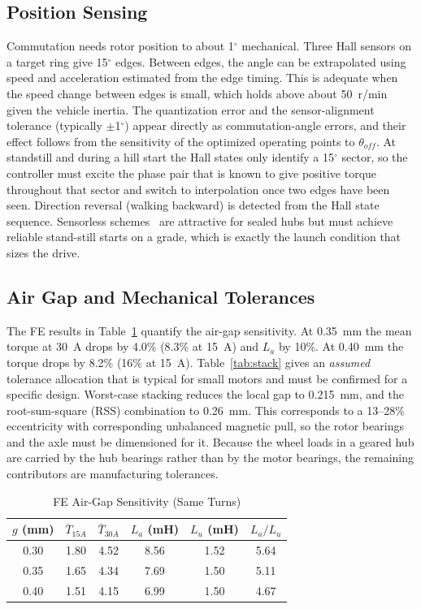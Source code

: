 \documentclass[journal]{IEEEtran}
\begin{document}
\subsection{Position Sensing}
Commutation needs rotor position to about 1$^\circ$ mechanical. Three Hall
sensors on a target ring give 15$^\circ$ edges. Between edges, the angle can be
extrapolated using speed and acceleration estimated from the edge timing. This
is adequate when the speed change between edges is small, which holds above
about 50~r/min given the vehicle inertia. The quantization error and the
sensor-alignment tolerance (typically $\pm$1$^\circ$) appear directly as
commutation-angle errors, and their effect follows from the sensitivity of
the optimized operating points to $\theta_{off}$. At standstill and during a
hill start the Hall states only identify a 15$^\circ$ sector, so the controller
must excite the phase pair that is known to give positive torque throughout
that sector and switch to interpolation once two edges have been seen.
Direction reversal (walking backward) is detected from the Hall state
sequence. Sensorless schemes~\cite{ehsani2002} are attractive for sealed hubs
but must achieve reliable stand-still starts on a grade, which is exactly the
launch condition that sizes the drive.

\subsection{Air Gap and Mechanical Tolerances}
The FE results in Table~\ref{tab:gap} quantify the air-gap sensitivity. At
0.35~mm the mean torque at 30~A drops by 4.0\% (8.3\% at 15~A) and $L_a$ by
10\%. At 0.40~mm the torque drops by 8.2\% (16\% at 15~A). Table~\ref{tab:stack}
gives an \emph{assumed} tolerance allocation that is typical for small motors
and must be confirmed for a specific design. Worst-case stacking reduces the
local gap to 0.215~mm, and the root-sum-square (RSS) combination to 0.26~mm.
This corresponds to a 13--28\% eccentricity with corresponding unbalanced
magnetic pull, so the rotor bearings and the axle must be dimensioned for it.
Because the wheel loads in a geared hub are carried by the hub bearings
rather than by the motor bearings, the remaining contributors are
manufacturing tolerances.

\begin{table}[!t]
\caption{FE Air-Gap Sensitivity (Same Turns)}
\label{tab:gap}
\centering
\renewcommand{\arraystretch}{1.08}
\begin{tabular}{c c c c c c}
\hline
$g$ (mm) & $\bar T_{15A}$ & $\bar T_{30A}$ & $L_a$ (mH) & $L_u$ (mH) & $L_a/L_u$\\
\hline
0.30 & 1.80 & 4.52 & 8.56 & 1.52 & 5.64\\
0.35 & 1.65 & 4.34 & 7.69 & 1.50 & 5.11\\
0.40 & 1.51 & 4.15 & 6.99 & 1.50 & 4.67\\
\hline
\end{tabular}
\end{table}
\end{document}
